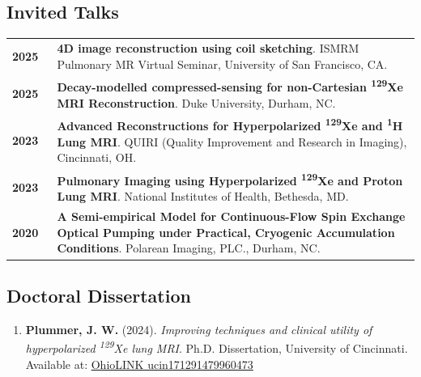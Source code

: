 \documentclass[11pt,]{scrartcl}
\begin{document}
\subsection{Invited Talks} %

\begin{table}[h!]
{\def\arraystretch{1.4}\tabcolsep=0pt
\begin{tabular}{p{0.11\linewidth}p{0.89\linewidth}}

    \textbf{2025} & \textbf{4D image reconstruction using coil sketching}. ISMRM Pulmonary MR Virtual Seminar, University of San Francisco, CA. \\[0.1cm]

    \textbf{2025} & \textbf{Decay-modelled compressed-sensing for non-Cartesian \textsuperscript{129}Xe MRI Reconstruction}. Duke University, Durham, NC. \\[0.1cm]
  
    \textbf{2023} & \textbf{Advanced Reconstructions for Hyperpolarized \textsuperscript{129}Xe and \textsuperscript{1}H Lung MRI}. QUIRI (Quality Improvement and Research in Imaging), Cincinnati, OH. \\[0.1cm]

    \textbf{2023} & \textbf{Pulmonary Imaging using Hyperpolarized \textsuperscript{129}Xe and Proton Lung MRI}. National Institutes of Health, Bethesda, MD. \\[0.1cm]

    \textbf{2020} & \textbf{A Semi-empirical Model for Continuous-Flow Spin Exchange Optical Pumping under Practical, Cryogenic Accumulation Conditions}. Polarean Imaging, PLC., Durham, NC. \\
    
\end{tabular}%
}
\end{table}

\subsection{Doctoral Dissertation}

\begin{enumerate}
    \leftskip-0.13in
    \item \textbf{Plummer, J. W.} (2024). \textit{Improving techniques and clinical utility of hyperpolarized \textsuperscript{129}Xe lung MRI}. Ph.D. Dissertation, University of Cincinnati. Available at: \href{http://rave.ohiolink.edu/etdc/view?acc_num=ucin171291479960473}{OhioLINK ucin171291479960473}
\end{enumerate}
\end{document}
